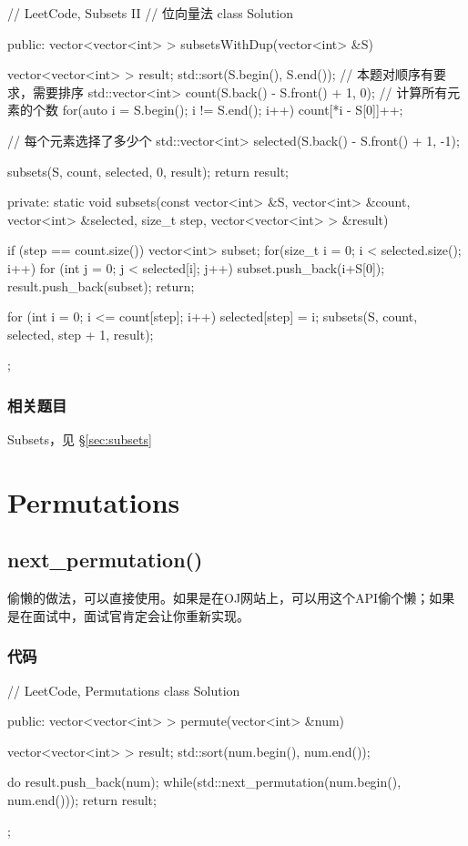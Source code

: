 \begin{Code}
// LeetCode, Subsets II
// 位向量法
class Solution {
public:
    vector<vector<int> > subsetsWithDup(vector<int> &S) {
        vector<vector<int> > result;
        std::sort(S.begin(), S.end()); // 本题对顺序有要求，需要排序
        std::vector<int> count(S.back() - S.front() + 1, 0);
        // 计算所有元素的个数
        for(auto i = S.begin(); i != S.end(); i++) {
            count[*i - S[0]]++;
        }

        // 每个元素选择了多少个
        std::vector<int> selected(S.back() - S.front() + 1, -1);

        subsets(S, count, selected, 0, result);
        return result;
    }

private:
    static void subsets(const vector<int> &S, vector<int> &count,
            vector<int> &selected, size_t step, vector<vector<int> > &result) {
        if (step == count.size()) {
            vector<int> subset;
            for(size_t i = 0; i < selected.size(); i++) {
                for (int j = 0; j < selected[i]; j++) {
                    subset.push_back(i+S[0]);
                }
            }
            result.push_back(subset);
            return;
        }

        for (int i = 0; i <= count[step]; i++) {
            selected[step] = i;
            subsets(S, count, selected, step + 1, result);
        }
    }
};
\end{Code}


\subsubsection{相关题目}
\begindot
\item Subsets，见 \S \ref{sec:subsets}
\myenddot


\section{Permutations} %
\label{sec:permutations}


\subsection{next_permutation()}
\label{sec:next-permutation}
偷懒的做法，可以直接使用。如果是在OJ网站上，可以用这个API偷个懒；如果是在面试中，面试官肯定会让你重新实现。

\subsubsection{代码}
\begin{Code}
// LeetCode, Permutations
class Solution {
public:
    vector<vector<int> > permute(vector<int> &num) {
        vector<vector<int> > result;
        std::sort(num.begin(), num.end());

        do {
            result.push_back(num);
        } while(std::next_permutation(num.begin(), num.end()));
        return result;
    }
};
\end{Code}


